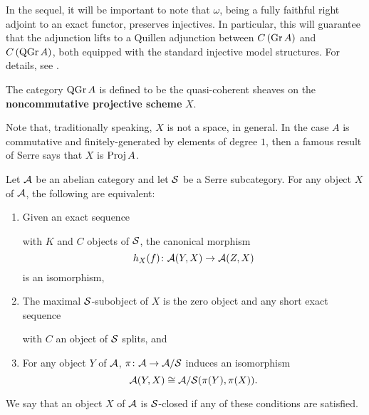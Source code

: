 \begin{remark}
  In the sequel, it will be important to note that \(\omega\), being a fully faithful right adjoint to an exact functor, preserves injectives.
  In particular, this will guarantee that the adjunction lifts to a Quillen adjunction between \(C\left(\operatorname{Gr}A\right)\) and \(C\left(\operatorname{QGr}A\right)\), both equipped with the standard injective model structures.  For details, see \textcite{Hovey01}.
\end{remark}

The category \(\operatorname{QGr}A\) is defined to be the quasi-coherent sheaves on the \textbf{noncommutative projective scheme} \(X\). 

\begin{remark}
  Note that, traditionally speaking, \(X\) is not a space, in general. In the case \(A\) is commutative and finitely-generated by elements of degree \(1\), then a famous result of Serre says that \(X\) is \(\operatorname{Proj} A\).
\end{remark}

\begin{proposition}\label{defn: serre closed}
  Let \(\mathcal{A}\) be an abelian category and let \(\mathcal{S}\) be a Serre subcategory.
  For any object \(X\) of \(\mathcal{A}\), the following are equivalent:
  \begin{enumerate}
  \item\label{defn: serre closed 1}
    Given an exact sequence 
    \begin{center}
    \end{center}
    with $K$ and $C$ objects of $\mathcal{S}$, the canonical morphism
    $$h_X(f) \colon \mathcal{A}(Y,X) \to \mathcal{A}(Z,X)$$
    is an isomorphism,
  \item\label{defn: serre closed 2}
    The maximal \(\mathcal{S}\)-subobject of $X$ is the zero object and any short exact sequence 
    \begin{center}
    \end{center}
    with $C$ an object of $\mathcal{S}$ splits, and
  \item\label{defn: serre closed 3}
    For any object $Y$ of $\mathcal{A}$, $\pi \colon \mathcal{A} \rightarrow \mathcal{A}/\mathcal{S}$ induces an isomorphism
    $$\mathcal{A}(Y, X) \cong \mathcal{A}/\mathcal{S}(\pi(Y), \pi(X)).$$
  \end{enumerate}
  We say that an object \(X\) of \(\mathcal{A}\) is \(\mathcal{S}\)-closed if any of these conditions are satisfied.
\end{proposition}

